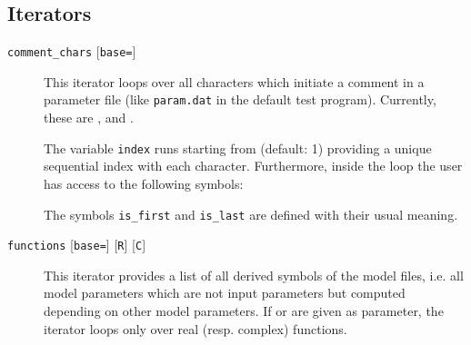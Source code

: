 \documentclass[11pt,a4paper]{refrep}
\begin{document}
\subsection{Iterators}
\begin{description}
\item[\texttt{comment\_chars} {[\texttt{base=}]}
]
   This iterator loops over all characters which initiate a
   comment in a parameter file (like \texttt{param.dat} in the default
   test program). Currently, these are \lit{!}, \lit{;} and \lit{\#}.

   The variable \texttt{index} runs starting from  (default: 1)
   providing a unique sequential index with each character.
   Furthermore, inside the
   loop the user has access to the following symbols:
   The symbols \texttt{is\_first} and \texttt{is\_last} are defined with
   their usual meaning.
\item[\texttt{functions}
   {[\texttt{base=}]}
   {[\texttt{R}]}
   {[\texttt{C}]}
] This iterator provides a list of all derived
   symbols of the model files, i.e. all model parameters which are not
   input parameters but computed depending on other model parameters.
   If  or  are given as parameter, the iterator loops only
   over real (resp. complex) functions.


\end{description}
\end{document}
